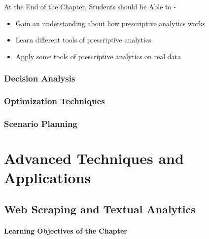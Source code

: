 \documentclass[
  letterpaper,
  DIV=11,
  numbers=noendperiod]{scrreprt}
\begin{document}
\begin{tcolorbox}[enhanced jigsaw, arc=.35mm, bottomrule=.15mm, bottomtitle=1mm, breakable, colback=white, colbacktitle=quarto-callout-note-color!10!white, colframe=quarto-callout-note-color-frame, coltitle=black, left=2mm, leftrule=.75mm, opacityback=0, opacitybacktitle=0.6, rightrule=.15mm, title=\textcolor{quarto-callout-note-color}{\faInfo}\hspace{0.5em}{Learning Objectives}, titlerule=0mm, toprule=.15mm, toptitle=1mm]

At the End of the Chapter, Students should be Able to -

\begin{itemize}
\item
  Gain an understanding about how prescriptive analytics works
\item
  Learn different tools of prescriptive analytics
\item
  Apply some tools of prescriptive analytics on real data
\end{itemize}

\end{tcolorbox}

\section{Decision Analysis}\label{decision-analysis}

\section{Optimization Techniques}\label{optimization-techniques}

\section{Scenario Planning}\label{scenario-planning}

\part{Advanced Techniques and Applications}

\chapter{Web Scraping and Textual
Analytics}\label{web-scraping-and-textual-analytics}

\subsection*{Learning Objectives of the
Chapter}\label{learning-objectives-of-the-chapter-8}
\end{document}
